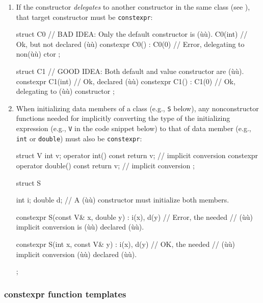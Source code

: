\begin{enumerate}
\item{If the constructor \emph{delegates} to another constructor in the same class (see ), that target constructor must be \lstinline!constexpr!:

\begin{emcppslisting}
struct C0  // BAD IDEA: Only the default constructor is (ù{}ù).
{
              C0(int)      { }  // Ok, but not declared (ù{}ù)
    constexpr C0() : C0(0) { }  // Error, delegating to non(ù{}ù) ctor
};

struct C1  // GOOD IDEA: Both default and value constructor are (ù{}ù).
{
    constexpr C1(int)      { }  // Ok, declared (ù{}ù)
    constexpr C1() : C1(0) { }  // Ok, delegating to (ù{}ù) constructor
};
\end{emcppslisting}
}


\item{When initializing data members of a class (e.g., \lstinline!S! below), any nonconstructor functions needed for implicitly converting the type of the initializing expression (e.g., \lstinline!V! in the code snippet below) to that of data member (e.g., \lstinline!int! or \lstinline!double!) must also be \lstinline!constexpr!:

\begin{emcppslisting}
struct V
{
    int v;
              operator    int() const { return v; }  // implicit conversion
    constexpr operator double() const { return v; }  // implicit conversion
};

struct S
{
    int i; double d;  // A (ù{}ù) constructor must initialize both members.

    constexpr S(const V& x, double y) : i(x), d(y) { }  // Error, the needed
        // (ù{}ù) implicit conversion is (ù{}ù) declared (ù{}ù).

    constexpr S(int x, const V& y) : i(x), d(y) { }    // OK, the needed
        // (ù{}ù) implicit conversion (ù{}ù) declared (ù{}ù).
};
\end{emcppslisting}
}
\end{enumerate}


\subsubsection[\lstinline!constexpr! function templates]{{\SubsubsecCode constexpr} function templates}\label{constexpr-function-templates}

